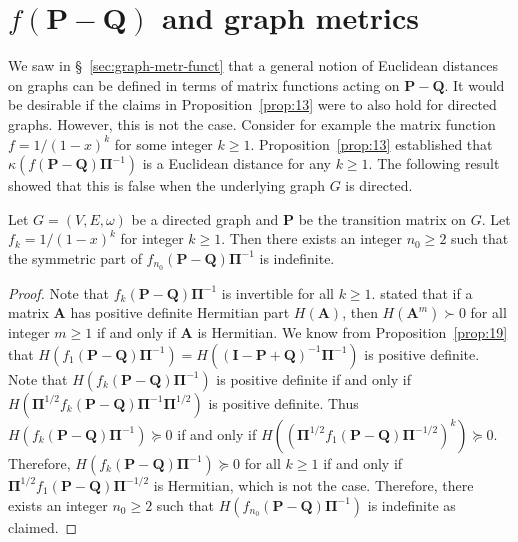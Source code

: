 \section{$f(\mathbf{P} - \mathbf{Q})$ and graph
  metrics} \label{sec:fmathbfp-mathbfq-gra} We saw in
\S~\ref{sec:graph-metr-funct} that a general notion of Euclidean
distances on graphs can be defined in terms of matrix functions acting
on $\mathbf{P} - \mathbf{Q}$. It would be desirable if the claims in
Proposition~\ref{prop:13} were to also hold for directed
graphs. However, this is not the case. Consider for example the matrix
function $f = 1/(1-x)^{k}$ for some integer $k \geq
1$. Proposition~\ref{prop:13} established that $\kappa(f(\mathbf{P} -
\mathbf{Q})\bm{\Pi}^{-1})$ is a Euclidean distance for any $k \geq
1$.  The following result showed that this is false when the
underlying graph $G$ is directed.  
\begin{proposition} 
  \label{prop:25}
  Let $G = (V,E,\omega)$ be a directed graph and $\mathbf{P}$ be the
  transition matrix on $G$. Let $f_k = 1/(1-x)^{k}$ for integer $k
  \geq 1$. Then there exists an integer $n_0 \geq 2$ such that the
  symmetric part of $f_{n_0}(\mathbf{P} - \mathbf{Q})\bm{\Pi}^{-1}$ is
  indefinite. 
\end{proposition} 
\begin{proof} Note that $f_k(\mathbf{P} - \mathbf{Q})\bm{\Pi}^{-1}$ is
  invertible for all $k \geq 1$. 
  \citet{johnson75:_power_matric_posit_defin_real_part} stated that if
  a matrix $\mathbf{A}$ has positive definite Hermitian part
  $H(\mathbf{A})$, then $H(\mathbf{A}^{m}) \succ 0$ for all integer $m
  \geq 1$ if and only if $\mathbf{A}$ is Hermitian. We know from
  Proposition~\ref{prop:19} that $H(f_1(\mathbf{P} -
  \mathbf{Q})\bm{\Pi}^{-1}) = H((\mathbf{I} - \mathbf{P} +
  \mathbf{Q})^{-1}\bm{\Pi}^{-1})$ is positive definite. Note that
  $H(f_{k}(\mathbf{P} - \mathbf{Q})\bm{\Pi}^{-1})$ is positive
  definite if and only if $H(\bm{\Pi}^{1/2}f_{k}(\mathbf{P} -
  \mathbf{Q}) \bm{\Pi}^{-1} \bm{\Pi}^{1/2})$ is positive
  definite. Thus $H(f_{k}(\mathbf{P} - \mathbf{Q})\bm{\Pi}^{-1})
  \succeq 0$ if and only if $H((\bm{\Pi}^{1/2}f_{1}(\mathbf{P} -
  \mathbf{Q})\bm{\Pi}^{-1/2})^{k}) \succeq 0$. Therefore,
  $H(f_{k}(\mathbf{P} - \mathbf{Q})\bm{\Pi}^{-1}) \succeq 0$ for all
  $k \geq 1$ if and only if $\bm{\Pi}^{1/2}f_{1}(\mathbf{P} -
  \mathbf{Q})\bm{\Pi}^{-1/2}$ is Hermitian, which is not the
  case. Therefore, there exists an integer $n_0 \geq 2$ such that
  $H(f_{n_0}(\mathbf{P} - \mathbf{Q})\bm{\Pi}^{-1})$ is indefinite as
  claimed.  \end{proof}
